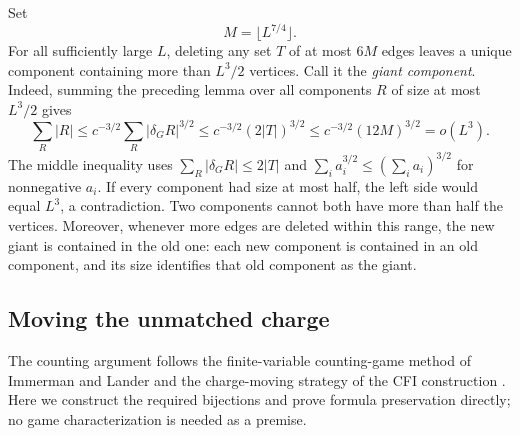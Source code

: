 Set
\[
 M=\lfloor L^{7/4}\rfloor.
\]
For all sufficiently large \(L\), deleting any set \(T\) of at most
\(6M\) edges leaves a unique component containing more than \(L^3/2\)
vertices.  Call it the \emph{giant component}.  Indeed, summing the preceding
lemma over all components \(R\) of size at most \(L^3/2\) gives
\begin{equation}
\label{eq:small-components}
 \sum_R |R|
 \le c^{-3/2}\sum_R|\delta_G R|^{3/2}
 \le c^{-3/2}(2|T|)^{3/2}
 \le c^{-3/2}(12M)^{3/2}=o(L^3).
\end{equation}
The middle inequality uses \(\sum_R|\delta_G R|\le2|T|\) and
\(\sum_i a_i^{3/2}\le(\sum_i a_i)^{3/2}\) for nonnegative \(a_i\).
If every component had size at most half, the left side would equal
\(L^3\), a contradiction.  Two components cannot both have more than
half the vertices.  Moreover, whenever more edges are deleted within this
range, the new giant is contained in the old one: each new component is
contained in an old component, and its size identifies that old component
as the giant.

\subsection{Moving the unmatched charge}

The counting argument follows the finite-variable counting-game method
of Immerman and Lander \cite[Counting Quantifiers]{immermanLander1990}
and the charge-moving strategy of the CFI construction
\cite[Lemma~6.2 and proof of Theorem~6.4]{cfi1992}.
Here we construct the required bijections and prove formula preservation
directly; no game characterization is needed as a premise.

